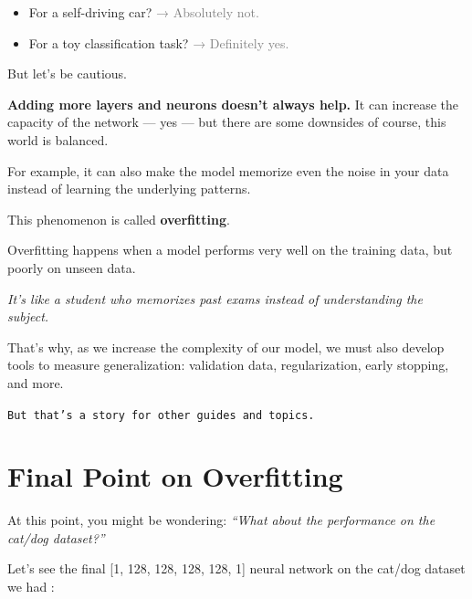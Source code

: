 \documentclass[11pt]{article}
\begin{document}
\begin{itemize}
    \item For a self-driving car? \textcolor{gray}{→ Absolutely not.}
    \item For a toy classification task? \textcolor{gray}{→ Definitely yes.}
\end{itemize}

\bigskip

But let’s be cautious.

\medskip

\noindent
\textbf{Adding more layers and neurons doesn’t always help.}  
It can increase the capacity of the network — yes — but there are some downsides of course, this world is balanced.

\medskip

\noindent
For example, it can also make the model memorize even the noise in your data instead of learning the underlying patterns.

\medskip

This phenomenon is called \textbf{overfitting}.

\medskip

\noindent
Overfitting happens when a model performs very well on the training data,  
but poorly on unseen data.

\medskip

\textit{It’s like a student who memorizes past exams instead of understanding the subject.}

\bigskip

\noindent
That’s why, as we increase the complexity of our model,  
we must also develop tools to measure generalization:  
validation data, regularization, early stopping, and more.

\bigskip

\begin{center}
\Large \texttt{But that’s a story for other guides and topics.}
\end{center}



\section*{Final Point on Overfitting}

\noindent
At this point, you might be wondering:  
\textit{“What about the performance on the cat/dog dataset?”}

\bigskip

Let's see the final [1, 128, 128, 128, 128, 1] neural network on the cat/dog dataset we had :
\end{document}
